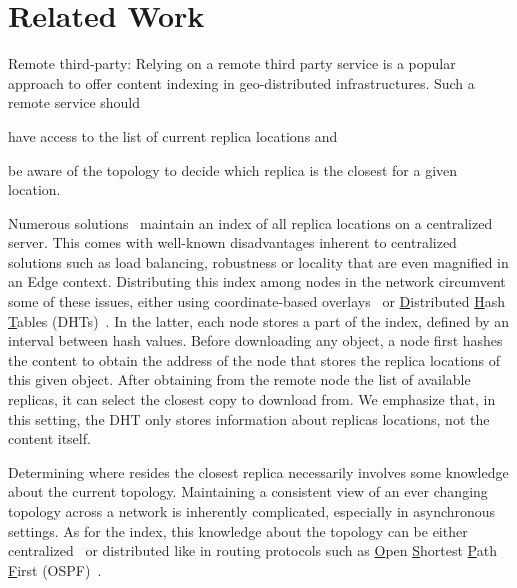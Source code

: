 
\section{Related Work}
\label{sec:related_work}


\begin{asparadesc}
\item [Remote third-party:]
Relying on a remote third party service is a popular approach to offer content indexing in geo-distributed infrastructures. 
Such a remote service should
\begin{inparaenum}[(i)]
\item have access to the list of current replica locations and
\item be aware of the topology to decide which replica is the
  closest for a given location.
\end{inparaenum}

\begin{inparaenum}[(i)]
\item Numerous solutions~\cite{snamp, p2p-oracle, fogstore, p2p-alto} maintain an index of all replica
locations on a centralized server. This comes with well-known disadvantages
inherent to centralized solutions such as load balancing, robustness or locality that are even magnified in an Edge context.
Distributing this index among nodes in the network circumvent some of
these issues, either using coordinate-based overlays~\cite{voronet,
  coin_19} or \underline{D}istributed \underline{H}ash
\underline{T}ables (DHTs)~\cite{ipfs, mdht, squirrel}. In
the latter, each node stores a part of the index, defined by an
interval between hash values.  Before downloading any object, a node
first hashes the content to obtain the address of the node that stores
the replica locations of this given object. After obtaining from the
remote node the list of available replicas, it can select the closest
copy to download from. We emphasize that, in this setting, the DHT
only stores information about replicas locations, not the content
itself. 


\item Determining where resides the closest replica necessarily involves some knowledge about the current topology.
Maintaining a consistent view of an ever changing
topology across a network is inherently complicated, especially in
asynchronous settings. As for the index,
this knowledge about the topology can be either
centralized~\cite{topology-discovery} or distributed like in routing
protocols such as \underline{O}pen \underline{S}hortest
\underline{P}ath \underline{F}irst (OSPF)~\cite{ospf}.
\end{inparaenum}



\end{asparadesc}
